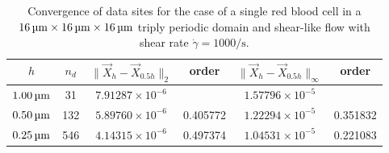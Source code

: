 \begin{table}
    \begin{center}
        \begingroup
        \setlength{\tabcolsep}{9pt}
        \renewcommand{\arraystretch}{1.5}
        \begin{tabular}{cc|cc|cc}
                                                                                                                                  \\ \toprule
            $h$       & $n_d$ &  $\|\vec{X}_h-\vec{X}_{0.5h}\|_2$ & order    & $\|\vec{X}_h-\vec{X}_{0.5h}\|_{\infty}$ & order    \\ \midrule
            $1.00\um$ & 31    &  $7.91287\times10^{-6}$           &          & $1.57796\times10^{-5}$                  &          \\
            $0.50\um$ & 132   &  $5.89760\times10^{-6}$           & 0.405772 & $1.22294\times10^{-5}$                  & 0.351832 \\
            $0.25\um$ & 546   &  $4.14315\times10^{-6}$           & 0.497374 & $1.04531\times10^{-5}$                  & 0.221083 \\ \bottomrule
        \end{tabular}
        \endgroup
    \end{center}
    \caption{%
        Convergence of data sites for the case of a single red blood cell in a
        $16\um\times16\um\times16\um$ triply periodic domain and shear-like
        flow with shear rate $\dot{\gamma} = 1000\si{\per\second}$.
    }
\end{table}
